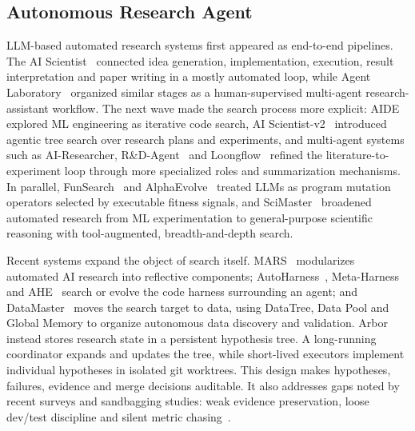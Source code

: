 \documentclass[]{selfevolagent}
\theoremstyle{plain}
\theoremstyle{definition}
\theoremstyle{remark}
\begin{document}
\subsection{Autonomous Research Agent}
LLM-based automated research systems first appeared as end-to-end pipelines. The AI Scientist~\citep{aiscientist} connected idea generation, implementation, execution, result interpretation and paper writing in a mostly automated loop, while Agent Laboratory~\citep{agentlaboratory} organized similar stages as a human-supervised multi-agent research-assistant workflow. The next wave made the search process more explicit: AIDE~\citep{aide} explored ML engineering as iterative code search, AI Scientist-v2~\citep{aiscientistv2} introduced agentic tree search over research plans and experiments, and multi-agent systems such as AI-Researcher, R\&D-Agent~\citep{rdagent} and Loongflow~\citep{loongflow} refined the literature-to-experiment loop through more specialized roles and summarization mechanisms. In parallel, FunSearch~\citep{funsearch} and AlphaEvolve~\citep{alphaevolve} treated LLMs as program mutation operators selected by executable fitness signals, and SciMaster~\citep{scimaster} broadened automated research from ML experimentation to general-purpose scientific reasoning with tool-augmented, breadth-and-depth search.

Recent systems expand the object of search itself. MARS~\citep{mars} modularizes automated AI research into reflective components; AutoHarness~\citep{autoharness}, Meta-Harness~\citep{metaharness} and AHE~\citep{ahe} search or evolve the code harness surrounding an agent; and DataMaster~\citep{datamaster} moves the search target to data, using DataTree, Data Pool and Global Memory to organize autonomous data discovery and validation. Arbor instead stores research state in a persistent hypothesis tree. A long-running coordinator expands and updates the tree, while short-lived executors implement individual hypotheses in isolated git worktrees. This design makes hypotheses, failures, evidence and merge decisions auditable. It also addresses gaps noted by recent surveys and sandbagging studies: weak evidence preservation, loose dev/test discipline and silent metric chasing~\citep{aiscientistsurvey,gasteiger2025automated}.
\end{document}
